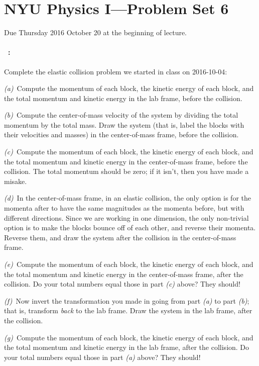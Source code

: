 \documentclass[12pt]{article}
\begin{document}
\section*{NYU Physics I---Problem Set 6}

Due Thursday 2016 October 20 at the beginning of lecture.

\paragraph{\problemname~\theproblem:}\label{elastic}%
Complete the elastic collision problem we started in class on 2016-10-04:

\textsl{(a)}~Compute the momentum of each block, the kinetic energy of
each block, and the total momentum and kinetic energy in the lab
frame, before the collision.

\textsl{(b)}~Compute the center-of-mass velocity of the system by
dividing the total momentum by the total mass. Draw the system (that
is, label the blocks with their velocities and masses) in the
center-of-mass frame, before the collision.

\textsl{(c)}~Compute the momentum of each block, the kinetic energy of
each block, and the total momentum and kinetic energy in the
center-of-mass frame, before the collision. The total momentum should
be zero; if it isn't, then you have made a misake.

\textsl{(d)}~In the center-of-mass frame, in an elastic collision, the
only option is for the momenta after to have the same magnitudes as
the momenta before, but with different directions. Since we are
working in one dimension, the only non-trivial option is to make the
blocks bounce off of each other, and reverse their momenta. Reverse
them, and draw the system after the collision in the center-of-mass
frame.

\textsl{(e)}~Compute the momentum of each block, the kinetic energy of
each block, and the total momentum and kinetic energy in the
center-of-mass frame, after the collision. Do your total numbers equal those
in part \textsl{(c)} above? They should!

\textsl{(f)}~Now invert the transformation you made in going from part
\textsl{(a)} to part \textsl{(b)}; that is, transform \emph{back} to
the lab frame. Draw the system in the lab frame, after the collision.

\textsl{(g)}~Compute the momentum of each block, the kinetic energy of
each block, and the total momentum and kinetic energy in the lab
frame, after the collision. Do your total numbers equal those in part
\textsl{(a)} above? They should!
\end{document}
